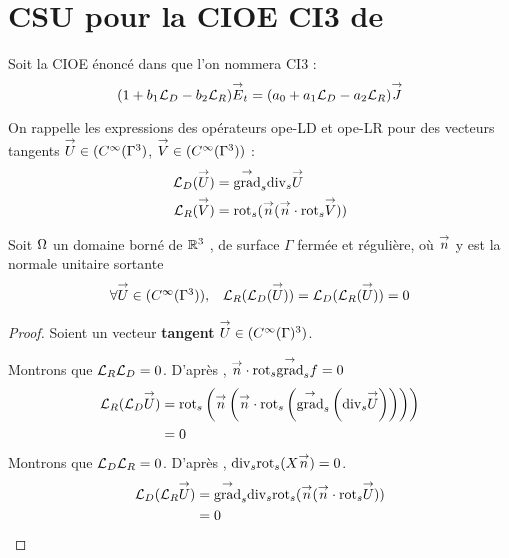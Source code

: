 \section{CSU pour la CIOE CI3 de \cite{aubakirov_electromagnetic_2014}}

  Soit la CIOE énoncé dans \cite{aubakirov_electromagnetic_2014} que l'on nommera CI3 :
  \begin{equation}
    \label{eq:unicite:ci3:ci3}
    ( 1 + b_1 \LD - b_2 \LR)\vE_t = (a_0 + a_1 \LD - a_2 \LR ) \vJ
  \end{equation}

  On rappelle les expressions des opérateurs \gls{ope-LD} et \gls{ope-LR} pour des vecteurs tangents \(\vect U \in (C^\infty(\Gamma^ 3)\), \( \vect V \in (C^\infty(\Gamma^3))\) :
  \begin{align*}
    \LD(\vect U) &= \tgrads \tdivs \vect U\\
    \LR(\vect V) &= \trots( \vn ( \vn \cdot \trots \vect V))\\
  \end{align*}
  \begin{prop}
    Soit \(\OO\) un domaine borné de \(\RR^3\) , de surface \(\Gamma\) fermée et régulière, où \(\vect n\) y est la normale unitaire
    sortante
    \begin{equation}
      \begin{matrix}
        \forall \vect U \in (C^\infty(\Gamma^3)) ,& \LR(\LD(\vect U)) = \LD(\LR(\vect U)) = 0
      \end{matrix}
    \end{equation}
  \end{prop}
  \begin{proof}

    Soient un vecteur \textbf{tangent} \(\vect U \in (C^\infty(\Gamma)^3)\).

    Montrons que \(\LR\LD = 0\). D’après \cite[p.~1029, A3.42]{bladel_electromagnetic_2007}, \(\vn \cdot \trots\tgrads f = 0\)
    \begin{align*}
      \LR(\LD \vect U)  &= \trots \left(\vn \left(\vn \cdot \trots \left( \tgrads \left(\tdivs \vect U\right)\right)\right)\right) \\
      &= 0
    \end{align*}
    Montrons que \(\LD\LR = 0\). D’après \cite[p.~1029, A3.43]{bladel_electromagnetic_2007}, \(\tdivs \trots (X\vn) = 0\).
    \begin{align*}
      \LD(\LR \vect U) &= \tgrads \tdivs \trots (\vn (\vn \cdot \trots \vect U)) \\
      &= 0
    \end{align*}
  \end{proof}

